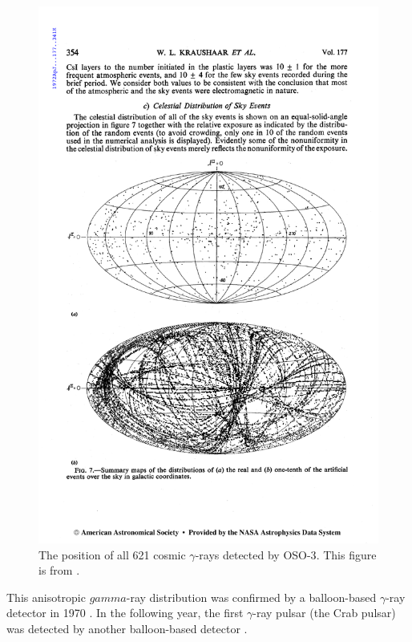 \begin{figure}[htbp]
  \centering
  \includegraphics{chapters/introduction/figures/kraushaar_et_al_1972_skymap.pdf}
  \caption{The position of all 621 cosmic $\gamma$-rays
  detected by \ac{OSO-3}. This figure is from
  \cite{kraushaar_1972_high-energy-cosmic}. }
\end{figure}

This anisotropic $gamma$-ray distribution
was confirmed by a balloon-based
$\gamma$-ray detector in 1970  \citep{kniffen_1970_study-gamma}.  In the
following year, the first $\gamma$-ray pulsar (the Crab pulsar) was detected
by another balloon-based detector \cite{browning_1971_detection-pulsed}.

